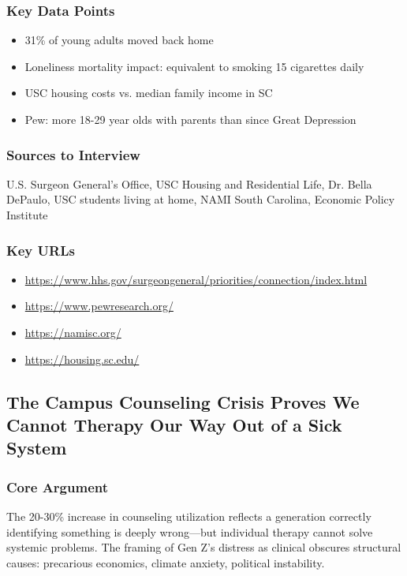 \documentclass[11pt,letterpaper]{article}
\begin{document}
\subsubsection*{Key Data Points}
\begin{itemize}[noitemsep]
    \item 31\% of young adults moved back home
    \item Loneliness mortality impact: equivalent to smoking 15 cigarettes daily
    \item USC housing costs vs. median family income in SC
    \item Pew: more 18-29 year olds with parents than since Great Depression
\end{itemize}

\subsubsection*{Sources to Interview}
U.S. Surgeon General's Office, USC Housing and Residential Life, Dr. Bella DePaulo, USC students living at home, NAMI South Carolina, Economic Policy Institute

\subsubsection*{Key URLs}
\begin{itemize}[noitemsep]
    \item \url{https://www.hhs.gov/surgeongeneral/priorities/connection/index.html}
    \item \url{https://www.pewresearch.org/}
    \item \url{https://namisc.org/}
    \item \url{https://housing.sc.edu/}
\end{itemize}

\newpage
\subsection{The Campus Counseling Crisis Proves We Cannot Therapy Our Way Out of a Sick System}

\subsubsection*{Core Argument}
The 20-30\% increase in counseling utilization reflects a generation correctly identifying something is deeply wrong---but individual therapy cannot solve systemic problems. The framing of Gen Z's distress as clinical obscures structural causes: precarious economics, climate anxiety, political instability.
\end{document}
